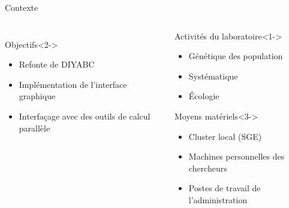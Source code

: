 \documentclass{beamer}
\begin{document}
\begin{frame}{Contexte}
\begin{columns}
\begin{column}[l]{0.5\linewidth}
\begin{columns}
\begin{column}[r]{0.5\linewidth}
\begin{figure}
        \end{figure}
        \end{column}
        \end{columns}
        \vspace{1cm}
	\begin{block}{Objectifs}<2->
			\begin{itemize}
                \item Refonte de DIYABC
				\item Implémentation de l'interface graphique
                \item Interfaçage avec des outils de calcul parallèle
			\end{itemize}
					
		\end{block}

	\end{column}
	\begin{column}[r]{0.5\linewidth}
	\begin{exampleblock}{Activités du laboratoire}<1->
			\begin{itemize}
				\item Génétique des population
                \item Systématique
                \item Écologie
			\end{itemize}
					
		\end{exampleblock}
	\begin{block}{Moyens matériels}<3->
			\begin{itemize}
                \item Cluster local (SGE)
				\item Machines personnelles des chercheurs
                \item Postes de travail de l'administration
			\end{itemize}
					
		\end{block}
	\end{column}
	\end{columns}
\end{frame}
\end{document}
